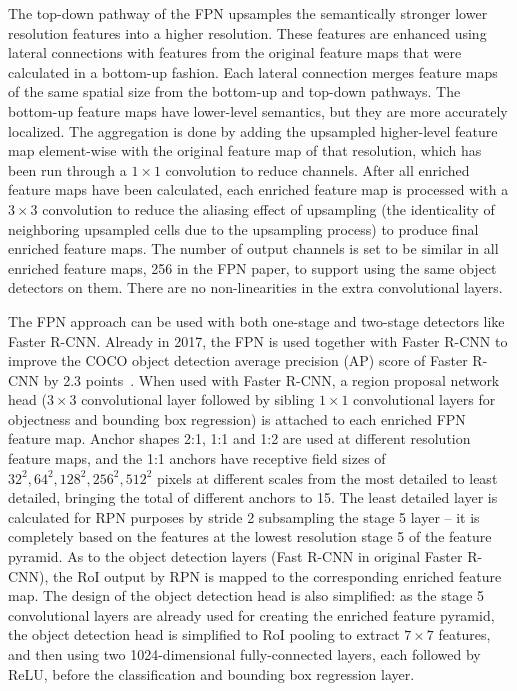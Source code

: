 \documentclass[english,twoside,openright]{HYgraduMLDS}
\begin{document}
The top-down pathway of the FPN upsamples the semantically stronger lower resolution features into a higher resolution. These features are enhanced using lateral connections with features from the original feature maps that were calculated in a bottom-up fashion. Each lateral connection merges feature maps of the same spatial size from the bottom-up and top-down pathways. The bottom-up feature maps have lower-level semantics, but they are more accurately localized. The aggregation is done by adding the upsampled higher-level feature map element-wise with the original feature map of that resolution, which has been run through a $1 \times 1$ convolution to reduce channels. After all enriched feature maps have been calculated, each enriched feature map is processed with a $3 \times 3$ convolution to reduce the aliasing effect of upsampling (the identicality of neighboring upsampled cells due to the upsampling process) to produce final enriched feature maps. The number of output channels is set to be similar in all enriched feature maps, 256 in the FPN paper, to support using the same object detectors on them. There are no non-linearities in the extra convolutional layers.

The FPN approach can be used with both one-stage and two-stage detectors like Faster R-CNN. Already in 2017, the FPN is used together with Faster R-CNN to improve the COCO object detection average precision (AP) score of Faster R-CNN by 2.3 points~\cite{FeaturePyramidNetworks}. When used with Faster R-CNN, a region proposal network head ($3 \times 3$ convolutional layer followed by sibling $1 \times 1$ convolutional layers for objectness and bounding box regression) is attached to each enriched FPN feature map. Anchor shapes 2:1, 1:1 and 1:2 are used at different resolution feature maps, and the 1:1 anchors have receptive field sizes of $32^2,64^2,128^2,256^2,512^2$ pixels at different scales from the most detailed to least detailed, bringing the total of different anchors to 15. The least detailed layer is calculated for RPN purposes by stride 2 subsampling the stage 5 layer -- it is completely based on the features at the lowest resolution stage 5 of the feature pyramid. As to the object detection layers (Fast R-CNN in original Faster R-CNN), the RoI output by RPN is mapped to the corresponding enriched feature map. The design of the object detection head is also simplified: as the stage 5 convolutional layers are already used for creating the enriched feature pyramid, the object detection head is simplified to RoI pooling to extract $7 \times 7$ features, and then using two 1024-dimensional fully-connected layers, each followed by ReLU,  before the classification and bounding box regression layer. 
\end{document}
